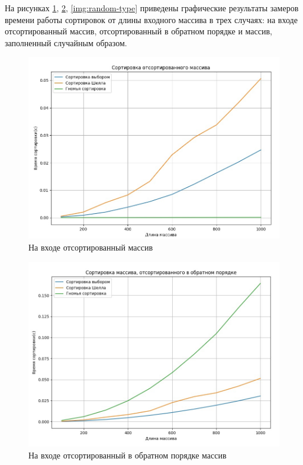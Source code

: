 На рисунках \ref{img:best-type}, \ref{img:worst-type}, \ref{img:random-type} приведены графические результаты замеров времени работы сортировок от длины входного массива в трех случаях: на входе отсортированный массив, отсортированный в обратном порядке и массив, заполненный случайным образом.

\begin{figure}[H]
	\begin{center}
		\includegraphics[scale=0.4]{img/best-type.jpg}
	\end{center}
	\captionsetup{justification=centering}
	\caption{На входе отсортированный массив}
	\label{img:best-type}
\end{figure}

\begin{figure}[H]
	\begin{center}
		\includegraphics[scale=0.4]{img/worst-type.jpg}
	\end{center}
	\captionsetup{justification=centering}
	\caption{На входе отсортированный в обратном порядке массив}
	\label{img:worst-type}
\end{figure}

